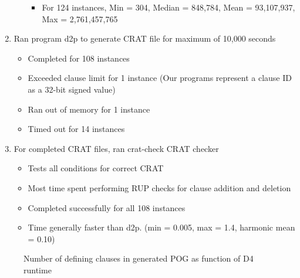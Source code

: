 \documentclass[letterpaper,USenglish,cleveref, autoref, thm-restate]{lipics-v2021}
\begin{document}
\begin{enumerate}
\begin{itemize}
\begin{itemize}
       \item For 124 instances, Min = 304, Median = 848,784, Mean = 93,107,937, Max = 2,761,457,765
       \end{itemize}
     \end{itemize}
   \item Ran program {\sc d2p} to generate CRAT file for maximum of 10,000 seconds
     \begin{itemize}
     \item Completed for 108 instances
     \item Exceeded clause limit for 1 instance (Our programs represent a clause ID as a 32-bit signed value)
     \item Ran out of memory for 1 instance
     \item Timed out for 14 instances
     \end{itemize}
   \item For completed CRAT files, ran {\sc crat-check} CRAT checker
     \begin{itemize}
     \item Tests all conditions for correct CRAT
     \item Most time spent performing RUP checks for clause addition and deletion
     \item Completed successfully for all 108 instances
     \item Time generally faster than {\sc d2p}. (min = 0.005, max = 1.4, harmonic mean = 0.10)
     \end{itemize}
\end{enumerate}

\begin{figure}
\caption{Number of defining clauses in generated POG as function of D4 runtime}
\label{fig:generate:d4:log}
\end{figure}
\end{document}
